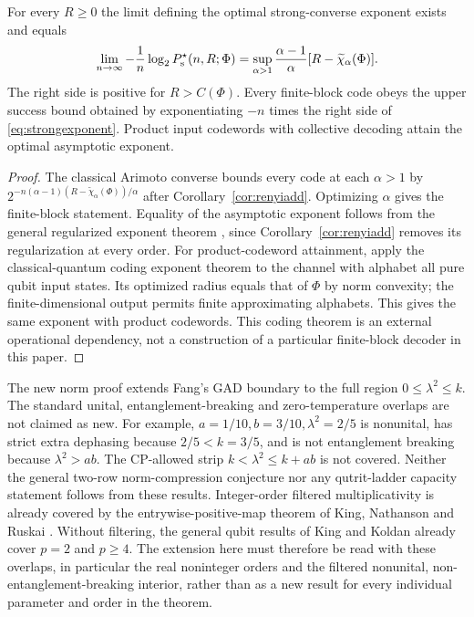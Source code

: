 \begin{corollary}\label{cor:exponent}
For every $R\ge0$ the limit defining the optimal strong-converse exponent
exists and equals
\begin{equation}\label{eq:strongexponent}
 \lim_{n\to\infty}-\frac1n\log_2 P_{\rm s}^{\star}(n,R;\Phi)
 =\sup_{\alpha>1}\frac{\alpha-1}{\alpha}
       [R-\widetilde\chi_\alpha(\Phi)].
\end{equation}
The right side is positive for $R>C(\Phi)$. Every finite-block code obeys
the upper success bound obtained by exponentiating $-n$ times the right
side of \eqref{eq:strongexponent}. Product input codewords with collective
decoding attain the optimal asymptotic exponent.
\end{corollary}
\begin{proof}
The classical Arimoto converse bounds every code at each $\alpha>1$ by
$2^{-n(\alpha-1)(R-\widetilde\chi_\alpha(\Phi))/\alpha}$ after
Corollary~\ref{cor:renyiadd}. Optimizing $\alpha$ gives the finite-block
statement. Equality of the asymptotic exponent follows from the general
regularized exponent theorem \cite[Theorem~5 and Appendix~E]{ct}, since
Corollary~\ref{cor:renyiadd} removes its regularization at every order.
For product-codeword attainment, apply the classical-quantum coding
exponent theorem \cite[Section~VI]{mo} to the channel with alphabet all
pure qubit input states. Its optimized radius equals that of $\Phi$
by norm convexity; the finite-dimensional output permits finite
approximating alphabets. This gives the same exponent with product
codewords. This coding theorem is an external operational dependency,
not a construction of a particular finite-block decoder in this paper.
\end{proof}

The new norm proof extends Fang's GAD boundary to the full region
$0\le\lambda^2\le k$. The standard unital, entanglement-breaking and
zero-temperature overlaps are not claimed as new. For example,
$a=1/10,b=3/10,\lambda^2=2/5$ is nonunital, has strict extra dephasing
because $2/5<k=3/5$, and is not entanglement breaking because
$\lambda^2>ab$. The CP-allowed strip $k<\lambda^2\le k+ab$ is not
covered. Neither the general two-row norm-compression conjecture nor
any qutrit-ladder capacity statement follows from these results.
Integer-order filtered multiplicativity is already covered by the
entrywise-positive-map theorem of King, Nathanson and Ruskai
\cite{knr}. Without filtering, the general qubit results of King and
Koldan \cite{koldan} already cover $p=2$ and $p\ge4$.
The extension here must therefore be read with these overlaps, in
particular the real noninteger orders and the filtered nonunital,
non-entanglement-breaking interior, rather than as a new result for
every individual parameter and order in the theorem.

